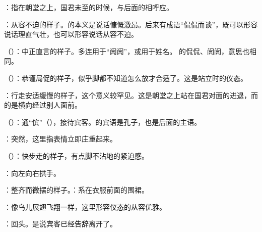 {
\item {}：指在朝堂之上，国君未至的时候，与后面的相呼应。

\item {}：从容不迫的样子。的本义是说话慷慨激昂。后来有成语“侃侃而谈”，既可以形容说话理直气壮，也可以形容说话从容不迫。

（）：中正直言的样子。多连用于“訚訚”，或用于姓名。 的侃侃、訚訚，意思也相同。

\item {}（）：恭谨局促的样子，似乎脚都不知道怎么放才合适了。这是站立时的仪态。

：行走安适缓慢的样子，这个意义较罕见。这是朝堂之上站在国君对面的进退，而  的是横向经过别人面前。
}
{}  %


{
\item {}（）：通“傧”（），接待宾客。的宾语是孔子，也是后面的主语。
\item {}：突然，这里指表情立即庄重起来。
\item {}（）：快步走的样子，有点脚不沾地的紧迫感。
\item {}：向左向右拱手。
\item {}：整齐而微摆的样子。：系在衣服前面的围裙。
\item {}：像鸟儿展翅飞翔一样，这里形容仪态的从容优雅。
\item {}：回头。是说宾客已经告辞离开了。
}
{}


